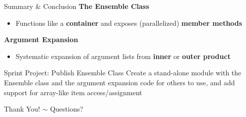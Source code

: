\documentclass[hyperref={pdfpagelabels=false},compress,final]{beamer}
\newenvironment{myRedBox}[3][upper=upred,lower=lowred,shadow=true]%
{\begin{center} \begin{minipage}{#2} \begin{beamerboxesrounded}[#1]{#3} \smallskip}%
      {\smallskip \end{beamerboxesrounded} \end{minipage} \end{center}}
\begin{document}
\begin{frame}{Summary \& Conclusion}  
  \bigskip
  {\Large \color{teal} \textbf{The Ensemble Class} }\smallskip
  \begin{itemize}
    \item Functions like a \textbf{container} and exposes (parallelized) \textbf{member methods}
  \end{itemize}
   \medskip
  {\Large {} \textbf{Argument Expansion} }\smallskip
  \begin{itemize}
    \item Systematic expansion of argument lists from \textbf{inner} or \textbf{outer product}
  \end{itemize}
  \medskip
  \begin{myRedBox}{0.9\textwidth}{Sprint Project: Publish Ensemble Class}
    Create a stand-alone module with the Ensemble class and the argument expansion code for others to use, and add support for array-like item access/assignment
  \end{myRedBox}
\end{frame}

\begin{frame}
 \vfill
 \begin{center}
 \LARGE
 Thank You!\hspace{1.5cm}  $\sim$ \hspace{1.5cm} Questions?
 \end{center}
 \vfill
\end{frame}
\end{document}
